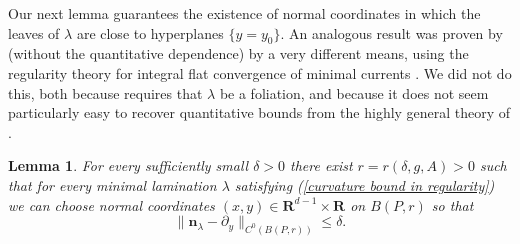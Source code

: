 \documentclass[final,12pt, leqno]{brownthesis}
\newcommand{\RR}{\mathbf{R}}
\newcommand{\normal}{\mathbf n}
\newtheorem{lemma}[theorem]{Lemma}
\theoremstyle{definition}
\numberwithin{equation}{section}
\begin{document}
Our next lemma guarantees the existence of normal coordinates in which the leaves of $\lambda$ are close to hyperplanes $\{y = y_0\}$.
An analogous result was proven by \cite{Solomon86} (without the quantitative dependence) by a very different means, using the regularity theory for integral flat convergence of minimal currents \cite[Theorem 5.3.14]{federer2014geometric}.
We did not do this, both because \cite{Solomon86} requires that $\lambda$ be a foliation, and because it does not seem particularly easy to recover quantitative bounds from the highly general theory of \cite[Chapter 5]{federer2014geometric}.

\begin{lemma}\label{lams have C0 fields}
	For every sufficiently small $\delta > 0$ there exist $r = r(\delta, g, A) > 0$ such that for every minimal lamination $\lambda$ satisfying (\ref{curvature bound in regularity}) we can choose normal coordinates $(x, y) \in \RR^{d - 1} \times \RR$ on $B(P, r)$ so that
\begin{equation}\label{normal is basically dy}
	\|\normal_\lambda - \partial_y\|_{C^0(B(P, r))} \leq \delta.
\end{equation}
\end{lemma}
\end{document}
